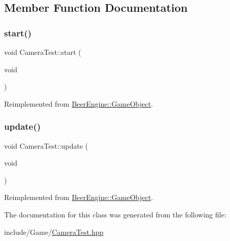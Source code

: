 \subsection{Member Function Documentation}
\mbox{\label{class_camera_test_a33618b16d2906b67b68e55ad15a8a33b}} 
\subsubsection{\texorpdfstring{start()}{start()}}
{\footnotesize\ttfamily void Camera\+Test\+::start (\begin{DoxyParamCaption}\item[{void}]{ }\end{DoxyParamCaption})\hspace{0.3cm}{\ttfamily [virtual]}}



Reimplemented from \mbox{\hyperlink{class_beer_engine_1_1_game_object_a2caa6e6105c6766fdac3688ff1e74f00}{Beer\+Engine\+::\+Game\+Object}}.

\mbox{\label{class_camera_test_a5bacc3399e57aa311e8d5ea39c9865bf}} 
\subsubsection{\texorpdfstring{update()}{update()}}
{\footnotesize\ttfamily void Camera\+Test\+::update (\begin{DoxyParamCaption}\item[{void}]{ }\end{DoxyParamCaption})\hspace{0.3cm}{\ttfamily [virtual]}}



Reimplemented from \mbox{\hyperlink{class_beer_engine_1_1_game_object_ab53f4154cb5cecd0b1238465f7d1fc81}{Beer\+Engine\+::\+Game\+Object}}.



The documentation for this class was generated from the following file\+:\begin{DoxyCompactItemize}
\item 
include/\+Game/\mbox{\hyperlink{_camera_test_8hpp}{Camera\+Test.\+hpp}}\end{DoxyCompactItemize}
